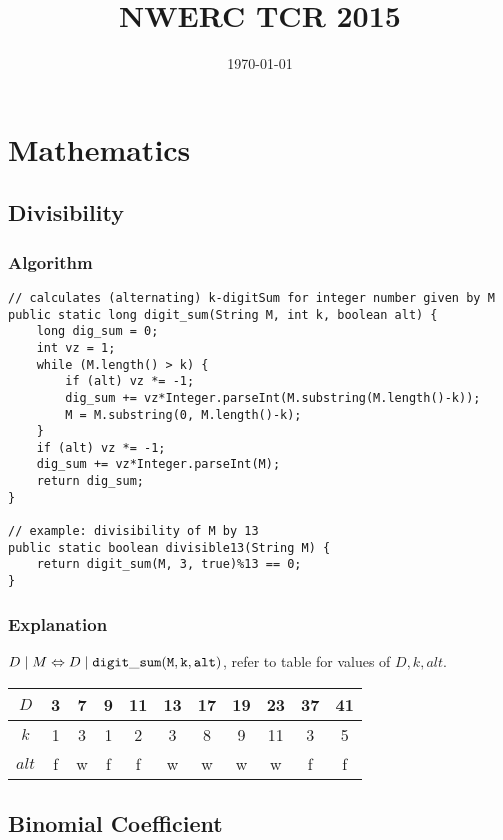 \documentclass[9pt]{article}   	%
\title{NWERC TCR 2015}
\date{\today}							%
\begin{document}

\section{Mathematics}

\subsection{Divisibility}

\subsubsection{Algorithm}

\begin{lstlisting}
// calculates (alternating) k-digitSum for integer number given by M
public static long digit_sum(String M, int k, boolean alt) {
	long dig_sum = 0;
	int vz = 1;
	while (M.length() > k) {
		if (alt) vz *= -1;
		dig_sum += vz*Integer.parseInt(M.substring(M.length()-k));
		M = M.substring(0, M.length()-k);
	}
	if (alt) vz *= -1;
	dig_sum += vz*Integer.parseInt(M);
	return dig_sum;
}

// example: divisibility of M by 13
public static boolean divisible13(String M) {
	return digit_sum(M, 3, true)%13 == 0;
}
\end{lstlisting}

\subsubsection{Explanation}

$D \mid M \Leftrightarrow D \mid {\tt digit\_sum(M, k, alt)}$, refer to table for values of $D, k, alt$.

\begin{table}[htbp]
\begin{tabular}{| c || c | c | c | c | c | c | c | c | c | c |}
\hline
$D$ & 3 & 7 & 9 & 11 & 13 & 17 & 19 & 23 & 37 & 41 \\
\hline
$k$ & 1 & 3 & 1 & 2 & 3 & 8 & 9 & 11 & 3 & 5 \\
\hline
$alt$ & f & w & f & f & w & w & w & w & f & f \\ 
\hline
\end{tabular}
\end{table}

\subsection{Binomial Coefficient}
\end{document}
